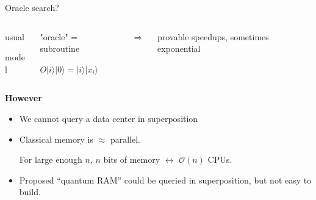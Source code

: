 \documentclass[
  ignorenonframetext,
]{beamer}
\begin{document}
\begin{frame}{Oracle search?}
\protect\hypertarget{oracle-search}{}
\begin{columns}[T]

\begin{column}{.1\textwidth}
\vspace{0.1cm}
usual

model
\end{column}

\begin{column}{.4\textwidth}
\begin{tcolorbox}[minipage,colback=white,arc=0pt,outer arc=0pt, boxsep=-2pt]
\centering
"oracle" = subroutine 

$O \lvert i \rangle \lvert 0 \rangle = \lvert i \rangle \lvert x_i \rangle$
\end{tcolorbox}
\end{column}

\pause

\begin{column}{.1\textwidth}
\vspace{0.5cm}
\centering
$\Rightarrow$

\end{column}
\begin{column}{.4\textwidth}
\vspace{0.1cm}
provable speedups,
sometimes exponential
\end{column}

\end{columns}

\pause

\begin{block}{\textbf{However}}
\protect\hypertarget{section-1}{}
\begin{itemize}
\item
  We cannot query a data center in superposition
\item
  Classical memory is \(\approx\) parallel.

  For large enough \(n\), \(n\) bits of memory \(\leftrightarrow\)
  \(\mathcal{O}(n)\) CPUs.
\item
  Proposed ``quantum RAM'' could be queried in superposition, but not
  easy to build.
\end{itemize}
\end{block}
\end{frame}
\end{document}
